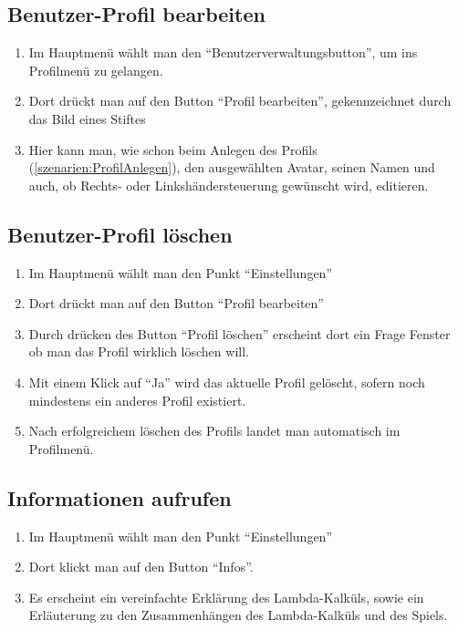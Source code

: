 \documentclass{scrartcl}
\begin{document}
\subsection{Benutzer-Profil bearbeiten} \label{szenarien:ProfilBearbeiten}
	\begin{enumerate}
		\item Im Hauptmenü wählt man den \enquote{Benutzerverwaltungsbutton}, um ins Profilmenü zu gelangen.
		\item Dort drückt man auf den Button \enquote{Profil bearbeiten}, gekennzeichnet durch das Bild eines Stiftes
		\item Hier kann man, wie schon beim Anlegen des Profils (\ref{szenarien:ProfilAnlegen}), den ausgewählten Avatar, seinen Namen und auch, ob Rechts- oder Linkshändersteuerung gewünscht wird, editieren.
	\end{enumerate}
	
\subsection{Benutzer-Profil löschen} \label{szenarien:ProfilLoeschen}
\begin{enumerate}
	\item Im Hauptmenü wählt man den Punkt \enquote{Einstellungen}
	\item Dort drückt man auf den Button \enquote{Profil bearbeiten}
	\item Durch drücken des Button \enquote{Profil löschen} erscheint dort ein Frage Fenster ob man das Profil wirklich löschen will.
	\item Mit einem Klick auf \enquote{Ja} wird das aktuelle Profil gelöscht, sofern noch mindestens ein anderes Profil existiert.
	\item Nach erfolgreichem löschen des Profils landet man automatisch im Profilmenü.
\end{enumerate}

\subsection{Informationen aufrufen} \label{szenarien:infomartionen_aufrufen}
\begin{enumerate}
	\item Im Hauptmenü wählt man den Punkt \enquote{Einstellungen}
	\item Dort klickt man auf den Button \enquote{Infos}.
	\item Es erscheint ein vereinfachte Erklärung des Lambda-Kalküls, sowie ein Erläuterung zu den Zusammenhängen des Lambda-Kalküls und des Spiels.
\end{enumerate}
\end{document}
